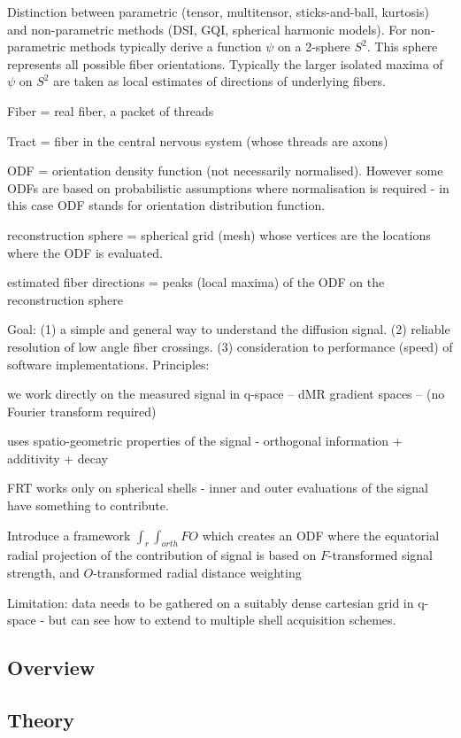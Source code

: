 \documentclass{bioinfo}
\begin{document}
Distinction between parametric (tensor, multitensor, sticks-and-ball,
kurtosis) and non-parametric methods (DSI, GQI, spherical harmonic
models). For non-parametric methods typically derive a function $\psi$
on a 2-sphere $S^2$. This sphere represents all possible fiber
orientations. Typically the larger isolated maxima of $\psi$ on $S^2$
are taken as local estimates of directions of underlying fibers.

Fiber = real fiber, a packet of threads

Tract = fiber in the central nervous system (whose threads are axons)

ODF = orientation density function (not necessarily normalised). However
some ODFs are based on probabilistic assumptions where normalisation is
required - in this case ODF stands for orientation distribution function.

reconstruction sphere = spherical grid (mesh) whose vertices are the
locations where the ODF is evaluated.

estimated fiber directions = peaks (local maxima) of the ODF on the
reconstruction sphere

Goal: (1) a simple and general way to understand the diffusion
signal. (2) reliable resolution of low angle fiber crossings. (3)
consideration to performance (speed) of software implementations.
Principles:

we work directly on the measured signal in q-space -- dMR gradient
spaces -- (no Fourier transform required)

uses spatio-geometric properties of the signal - orthogonal information
+ additivity + decay

FRT works only on spherical shells - inner and outer evaluations of the
signal have something to contribute.

Introduce a framework $\int_r \int_{orth} F O$ which creates an ODF
where the equatorial radial projection of the contribution of signal is
based on $F$-transformed signal strength, and $O$-transformed radial
distance weighting

Limitation: data needs to be gathered on a suitably dense cartesian grid
in q-space - but can see how to extend to multiple shell acquisition
schemes.


\subsection{Overview}

\subsection{Theory}
\end{document}
